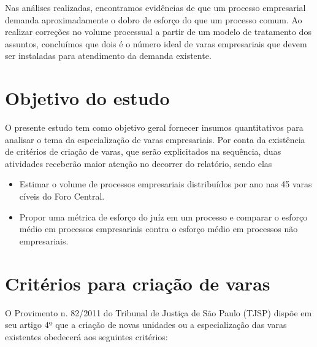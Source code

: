 \documentclass[]{book}
\providecommand{\tightlist}{%
  \setlength{\itemsep}{0pt}\setlength{\parskip}{0pt}}
\begin{document}
Nas análises realizadas, encontramos evidências de que um processo
empresarial demanda aproximadamente o dobro de esforço do que um
processo comum. Ao realizar correções no volume processual a partir de
um modelo de tratamento dos assuntos, concluímos que dois é o número
ideal de varas empresariais que devem ser instaladas para atendimento da
demanda existente.

\section{Objetivo do estudo}\label{objetivo-do-estudo}

O presente estudo tem como objetivo geral fornecer insumos quantitativos
para analisar o tema da especialização de varas empresariais. Por conta
da existência de critérios de criação de varas, que serão explicitados
na sequência, duas atividades receberão maior atenção no decorrer do
relatório, sendo elas

\begin{itemize}
\tightlist
\item
  Estimar o volume de processos empresariais distribuídos por ano nas 45
  varas cíveis do Foro Central.
\item
  Propor uma métrica de esforço do juíz em um processo e comparar o
  esforço médio em processos empresariais contra o esforço médio em
  processos não empresariais.
\end{itemize}

\section{Critérios para criação de
varas}\label{criterios-para-criacao-de-varas}

O Provimento n. 82/2011 do Tribunal de Justiça de São Paulo (TJSP)
dispõe em seu artigo 4º que a criação de novas unidades ou a
especialização das varas existentes obedecerá aos seguintes critérios:
\end{document}
